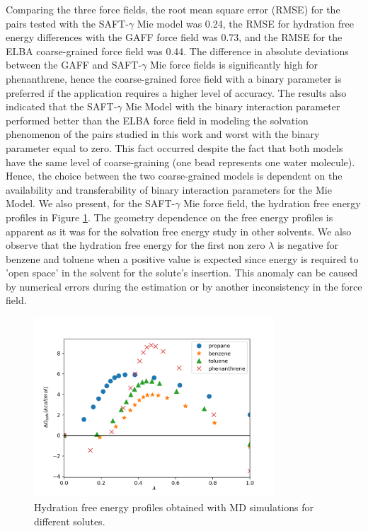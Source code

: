 Comparing the three force fields, the root mean square error (RMSE) for the pairs tested with the SAFT-$\gamma$     Mie model was  0.24, the RMSE for hydration free energy differences with the GAFF force field was 0.73, and the RMSE for the ELBA coarse-grained force field was 0.44. The difference in absolute deviations between the GAFF and SAFT-$\gamma$     Mie force fields is significantly high for phenanthrene, hence the coarse-grained force field with a binary parameter is preferred if the application requires a higher level of accuracy. The results also indicated that the SAFT-$\gamma$ Mie Model with the binary interaction parameter performed better than the ELBA force field in modeling the solvation phenomenon of the pairs studied in this work and worst with the binary parameter equal to zero. This fact occurred despite the fact that both models have the same level of coarse-graining (one bead represents one water molecule). Hence, the choice between the two coarse-grained models is dependent on the availability and transferability of binary interaction parameters for the Mie Model. We also present, for the SAFT-$\gamma$ Mie force field, the hydration free energy profiles in Figure \ref{fig:water}. The geometry dependence on the free energy profiles is apparent as it was for the solvation free energy study in other solvents. We also observe that the hydration free energy for the first non zero $\lambda$ is negative for benzene and toluene when a positive value is expected since energy is required to 'open space' in the solvent for the solute's insertion. This anomaly can be caused by numerical errors during the estimation or by another inconsistency in the force field. 

\begin{figure}[H]
\centering
\includegraphics[width=0.8\textwidth]{Figures/water}
\caption{Hydration free energy profiles obtained with MD simulations for different solutes.}
\label{fig:water}
\end{figure}

